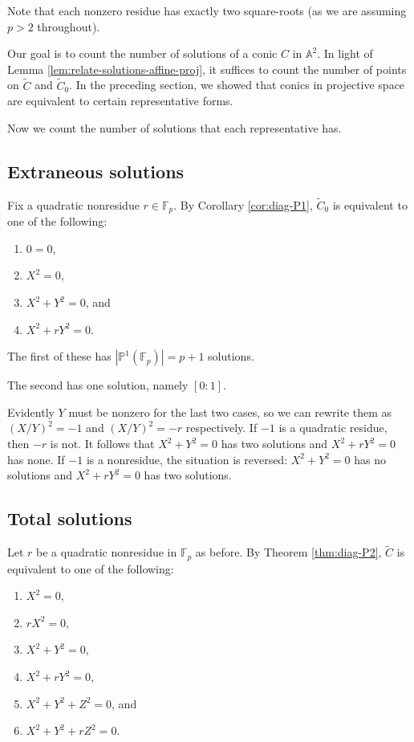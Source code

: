 \documentclass[10pt,a4paper]{amsart}
\numberwithin{equation}{section}
\numberwithin{figure}{section}
\theoremstyle{definition}
\theoremstyle{remark}
\theoremstyle{plain}
\theoremstyle{plain}
\theoremstyle{definition}
\theoremstyle{plain}
\theoremstyle{plain}
\newcommand{\A}{\mathbb{A}}
\renewcommand{\P}{\mathbb{P}}
\newcommand{\F}{\mathbb{F}}
\begin{document}
	Note that each nonzero residue has exactly two square-roots (as we are assuming
	$p > 2$ throughout).
	
	Our goal is to count the number of solutions of a conic $C$ in $\A^2$. In light of Lemma \ref{lem:relate-solutions-affine-proj}, it suffices to count the number of points on $\widetilde{C}$ and $\widetilde{C}_0$. In the preceding section, we showed that conics in projective space are equivalent to certain representative forms.
	
	Now we count the number of solutions that each representative has.
	
	\subsection{Extraneous solutions}
	\label{subsec:counting-P1-solutions}
	
	Fix a quadratic nonresidue $r \in \F_p$. By Corollary \ref{cor:diag-P1}, $\widetilde{C}_0$ is equivalent to one of the following:
	\begin{enumerate} 
		\item $0 = 0$, 
		\item $X^2 = 0$,
		\item $X^2 + Y^2 = 0$, and \label{case:x^2+y^2=0}
		\item $X^2 + rY^2 = 0$.  
	\end{enumerate}
	
	The first of these has $|\P^1(\F_p)| = p+1$ solutions. 
	
	The second has one solution, namely $[0:1]$.
	
	Evidently $Y$ must be nonzero for the last two cases, so we can rewrite them as
	$(X/Y)^2 = -1$ and $(X/Y)^2 = -r$ respectively. If $-1$ is a quadratic residue,
	then $-r$ is not. It follows that $X^2 + Y^2 = 0$ has two solutions and $X^2 +
	rY^2 = 0$ has none. If $-1$ is a nonresidue, the situation is reversed: $X^2 +
	Y^2 = 0$ has no solutions and $X^2 + rY^2 = 0$ has two solutions.
	
	\subsection{Total solutions}
	\label{subsec:counting-P2-solutions}
	
	Let $r$ be a quadratic nonresidue in $\F_p$ as before. By Theorem \ref{thm:diag-P2}, $\widetilde{C}$ is equivalent to one of the following:
	\begin{enumerate} 
		\item\label{case:rank1_x^2=0} $X^2 = 0$,
		\item\label{case:rank1_rx^2=0} $rX^2 = 0$,
		\item\label{case:rank2_x^2+y^2=0} $X^2 + Y^2 = 0$, 
		\item\label{case:rank2_x^2+ry^2=0} $X^2 + rY^2 = 0$,
		\item\label{case:rank3_x^2+y^2+z^2=0} $X^2 + Y^2 + Z^2 = 0$, and 
		\item\label{case:rank3_x^2+y^2+rz^2=0} $X^2 + Y^2 + rZ^2 = 0$.  
	\end{enumerate}
	
\end{document}
